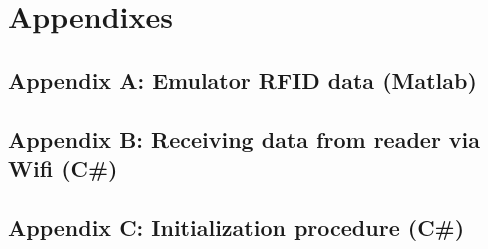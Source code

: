 \section{Appendixes}

\subsection{Appendix A: Emulator RFID data (Matlab)}\label{Sec_AppA}
\scriptsize


\subsection{Appendix B: Receiving data from reader via Wifi (C\#)}\label{Sec_AppB}
\scriptsize


\pagebreak
\subsection{Appendix C: Initialization procedure (C\#)}\label{Sec_AppC}
\scriptsize
